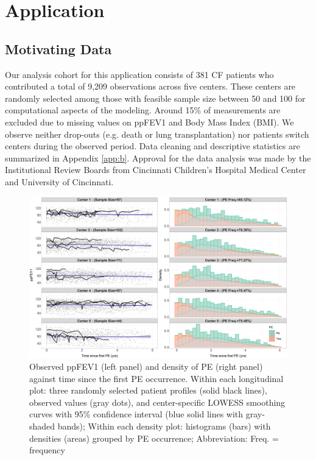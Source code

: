 \section{Application} \label{sec:chp2_app}

\subsection{Motivating Data}
Our analysis cohort for this application consists of 381 CF patients who contributed a total of 9,209 observations across five centers. These centers are randomly selected among those with feasible sample size between 50 and 100 for computational aspects of the modeling. Around 15\% of measurements are excluded due to missing values on ppFEV1 and Body Mass Index (BMI). We observe neither drop-outs (e.g. death or lung transplantation) nor patients switch centers during the observed period. Data cleaning and descriptive statistics are summarized in Appendix \ref{app:b}. Approval for the data analysis was made by the Institutional Review Boards from Cincinnati Children's Hospital Medical Center and University of Cincinnati. 

\begin{figure}[ht]
\centering
\includegraphics[width=\textwidth]{Figures/Chp2_display.jpg}
\caption{Observed ppFEV1 (left panel) and density of PE (right panel) against time since the first PE occurrence. Within each longitudinal plot: three randomly selected patient profiles (solid black lines), observed values (gray dots), and center-specific LOWESS smoothing curves with 95\% confidence interval (blue solid lines with gray-shaded bands); Within each density plot: histograms (bars) with densities (areas) grouped by PE occurrence; Abbreviation: Freq. = frequency}
\label{display}
\end{figure}

